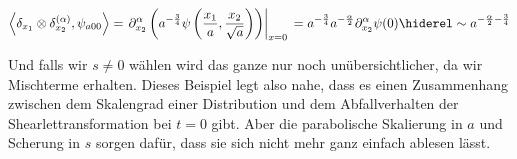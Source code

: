 \begin{dmath*}
    \left\langle \delta_{x_1} \otimes \delta_{x_2}^{(\alpha)}, \psi_{a00} \right\rangle
    =
    \left.\partial_{x_2}^\alpha \left(a^{-\frac{3}{4}}\psi\left(\frac{x_1}{a}, \frac{x_2}{\sqrt a}\right)\right)\right|_{x=0} \\
    =
    a^{-\frac{3}{4}} a^{-\frac{\alpha}{2}} \partial_{x_2}^\alpha \psi(0)
    \hiderel \sim a^{-\frac{\alpha}{2}-\frac{3}{4}}
\end{dmath*}

Und falls wir $s \neq 0$ wählen wird das ganze nur noch unübersichtlicher, da wir Mischterme erhalten. Dieses Beispiel legt also nahe, dass es einen Zusammenhang zwischen dem Skalengrad einer Distribution und dem Abfallverhalten der Shearlettransformation bei $t=0$ gibt. Aber die parabolische Skalierung in $a$ und Scherung in $s$ sorgen dafür, dass sie sich nicht mehr ganz einfach ablesen lässt.
